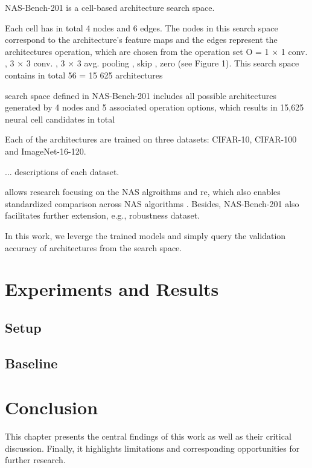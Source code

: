\documentclass[a4paper,oneside,bibliography=totoc]{scrbook}
\begin{document}
NAS-Bench-201 is a cell-based architecture search space. 

 Each cell has in total 4 nodes and 6 edges. The nodes in this search space correspond to the architecture’s feature maps and the edges represent the architectures operation, which are chosen from the operation set O = {1 × 1 conv. , 3 × 3 conv. , 3 × 3 avg. pooling , skip , zero} (see Figure 1). This search space contains in total 56 = 15 625 architectures

 search space defined in NAS-Bench-201 includes all possible architectures generated by 4 nodes and 5 associated operation options, which results in 15,625 neural cell candidates in total
 
Each of the architectures are trained on three datasets: CIFAR-10, CIFAR-100 and ImageNet-16-120. 

... descriptions of each dataset.



allows research focusing on the NAS algroithms and re, which also enables standardized comparison across NAS algorithms . Besides, NAS-Bench-201 also facilitates further extension, e.g., robustness dataset.


In this work, we leverge the trained models and simply query the validation accuracy of architectures from the search space.


\chapter{Experiments and Results}
\section{Setup}
\section{Baseline}


\chapter{Conclusion}
\label{Conclude}
This chapter presents the central findings of this work as well as their critical discussion. Finally, it highlights limitations and corresponding opportunities for further research.






\appendix
\printglossary[type=\acronymtype, title=Acronyms]
\end{document}

